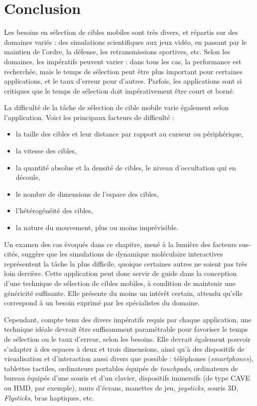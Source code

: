 	
	\section{Conclusion}    
	Les besoins en sélection de cibles mobiles sont très divers, et répartis sur des domaines variés : des simulations scientifiques aux jeux vidéo, en passant par le maintien de l'ordre, la défense, les retransmissions sportives, etc. Selon les domaines, les impératifs peuvent varier : dans tous les cas, la performance est recherchée, mais le temps de sélection peut être plus important pour certaines applications, et le taux d'erreur pour d'autres. Parfois, les applications sont si critiques que le temps de sélection doit impérativement être court et borné.
	
	La difficulté de la tâche de sélection de cible mobile varie également selon l'application. Voici les principaux facteurs de difficulté :
	\begin{itemize}
		\item la taille des cibles et leur distance par rapport au \og curseur \fg{} ou périphérique,
		\item la vitesse des cibles,
		\item la quantité absolue et la densité de cibles, le niveau d'occultation qui en découle,
		\item le nombre de dimensions de l'espace des cibles,
		\item l'hétérogénéité des cibles,
		\item la nature du mouvement, plus ou moins imprévisible.
	\end{itemize}
	Un examen des cas évoqués dans ce chapitre, mené à la lumière des facteurs sus-cités, suggère que les simulations de dynamique moléculaire interactives représentent la tâche la plus difficile, quoique certaines autres ne soient pas très loin derrière. Cette application peut donc servir de guide dans la conception d'une technique de sélection de cibles mobiles, à condition de maintenir une généricité suffisante. Elle présente du moins un intérêt certain, attendu qu'elle correspond à un besoin exprimé par les spécialistes du domaine.
	
	Cependant, compte tenu des divers impératifs requis par chaque application, une technique idéale devrait être suffisamment paramétrable pour favoriser le temps de sélection ou le taux d'erreur, selon les besoins. Elle devrait également pouvoir s'adapter à des espaces à deux et trois dimensions, ainsi qu'à des dispositifs de visualisation et d'interaction aussi divers que possible : téléphones (\emph{smartphones}), tablettes tactiles, ordinateurs portables équipés de \emph{touchpads}, ordinateurs de bureau équipés d'une souris et d'un clavier, dispositifs immersifs (de type CAVE ou HMD, par exemple), murs d'écrans, manettes de jeu, \emph{joysticks}, souris 3D, \emph{Flysticks}\footnotemark, bras haptiques, etc.
	
